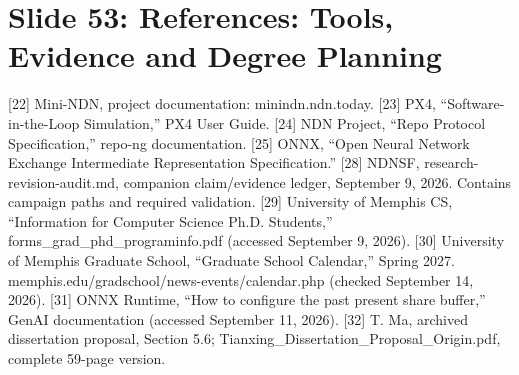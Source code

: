 \documentclass[11pt]{article}
\newcommand{\slideentry}[3]{\section*{Slide #1: #2}#3\par}
\begin{document}
\slideentry{53}{References: Tools, Evidence and Degree Planning}{
[22] Mini-NDN, project documentation: minindn.ndn.today. [23] PX4, “Software-in-the-Loop Simulation,” PX4 User Guide. [24] NDN Project, “Repo Protocol Specification,” repo-ng documentation. [25] ONNX, “Open Neural Network Exchange Intermediate Representation Specification.” [28] NDNSF, research-revision-audit.md, companion claim/evidence ledger, September 9, 2026. Contains campaign paths and required validation. [29] University of Memphis CS, “Information for Computer Science Ph.D. Students,” forms\_grad\_phd\_programinfo.pdf (accessed September 9, 2026). [30] University of Memphis Graduate School, “Graduate School Calendar,” Spring 2027. memphis.edu/gradschool/news-events/calendar.php (checked September 14, 2026). [31] ONNX Runtime, “How to configure the past present share buffer,” GenAI documentation (accessed September 11, 2026). [32] T. Ma, archived dissertation proposal, Section 5.6; Tianxing\_Dissertation\_Proposal\_Origin.pdf, complete 59-page version.
}
\end{document}
